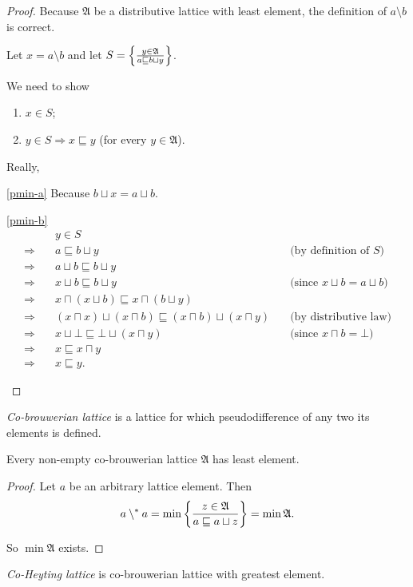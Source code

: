 \begin{proof}
Because $\mathfrak{A}$ be a distributive lattice with least element, the definition of $a\setminus b$
is correct.

Let $x=a\setminus b$ and let $S=\left\{ \frac{y\in\mathfrak{A}}{a\sqsubseteq b\sqcup y}\right\}$.

We need to show
\begin{enumerate}
\item\label{pmin-a} $x\in S$;
\item\label{pmin-b} $y\in S\Rightarrow x\sqsubseteq y$ (for every $y\in\mathfrak{A}$).
\end{enumerate}

Really,
\begin{disorder}
\item[\ref{pmin-a}] Because $b\sqcup x=a\sqcup b$.

\item[\ref{pmin-b}] ~
\begin{align*}
& y\in S \\
\Rightarrow \quad& a\sqsubseteq b\sqcup y & \quad \text{(by definition of $S$)} \\
\Rightarrow \quad& a\sqcup b\sqsubseteq b\sqcup y \\
\Rightarrow \quad& x\sqcup b\sqsubseteq b\sqcup y & \quad \text{(since $x\sqcup b=a\sqcup b$)} \\
\Rightarrow \quad& x\sqcap(x\sqcup b)\sqsubseteq x\sqcap(b\sqcup y) \\
\Rightarrow \quad& (x\sqcap x)\sqcup (x\sqcap b)\sqsubseteq (x\sqcap b)\sqcup(x\sqcap y) & \quad \text{(by distributive law)} \\
\Rightarrow \quad& x\sqcup \bot\sqsubseteq \bot\sqcup(x\sqcap y) & \quad \text{(since $x\sqcap b=\bot$)} \\
\Rightarrow \quad& x\sqsubseteq x\sqcap y & \quad \\
\Rightarrow \quad& x\sqsubseteq y.
\end{align*}
\end{disorder}
\end{proof}

\begin{defn}
\emph{Co-brouwerian lattice} is a lattice
for which pseudodifference of any two its elements is defined.\end{defn}
\begin{prop}
Every non-empty co-brouwerian lattice $\mathfrak{A}$ has least element.\end{prop}
\begin{proof}
Let $a$ be an arbitrary lattice element. Then
\[
a\setminus^{\ast} a=\min\left\{ \frac{z\in\mathfrak{A}}{a\sqsubseteq a\sqcup z}\right\}=\min\mathfrak{A}.
\]


So $\min\mathfrak{A}$ exists.\end{proof}
\begin{defn}
\emph{Co-Heyting lattice} is co-brouwerian
lattice with greatest element.
\end{defn}

